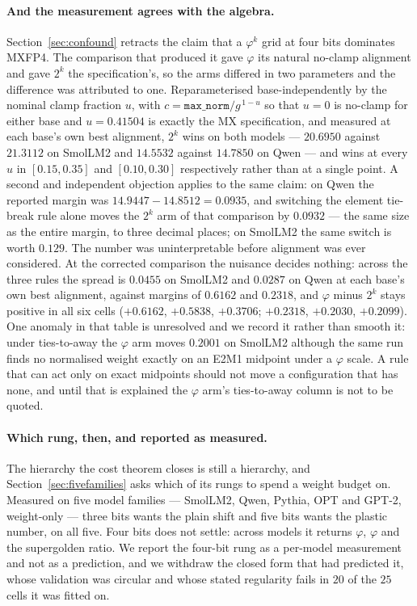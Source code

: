 \documentclass[11pt]{article}
\theoremstyle{definition}
\begin{document}
\paragraph{And the measurement agrees with the algebra.} Section~\ref{sec:confound}
retracts the claim that a $\varphi^{k}$ grid at four bits dominates MXFP4. The
comparison that produced it gave $\varphi$ its natural no-clamp alignment and
gave $2^{k}$ the specification's, so the arms differed in two parameters and
the difference was attributed to one. Reparameterised base-independently by
the nominal clamp fraction $u$, with $c = \texttt{max\_norm}/g^{\,1-u}$ so that
$u=0$ is no-clamp for either base and $u = 0.41504$ is exactly the MX
specification, and measured at each base's own best alignment, $2^{k}$ wins on
both models --- $20.6950$ against $21.3112$ on SmolLM2 and $14.5532$ against
$14.7850$ on Qwen --- and wins at every $u$ in $[0.15, 0.35]$ and
$[0.10, 0.30]$ respectively rather than at a single point. A second and
independent objection applies to the same claim: on Qwen the reported margin
was $14.9447 - 14.8512 = 0.0935$, and switching the element tie-break rule
alone moves the $2^{k}$ arm of that comparison by $0.0932$ --- the same size as
the entire margin, to three decimal places; on SmolLM2 the same switch is worth
$0.129$. The number was uninterpretable before alignment was ever considered.
At the corrected comparison the nuisance decides nothing: across the three
rules the spread is $0.0455$ on SmolLM2 and $0.0287$ on Qwen at each base's own
best alignment, against margins of $0.6162$ and $0.2318$, and $\varphi$ minus
$2^{k}$ stays positive in all six cells ($+0.6162$, $+0.5838$, $+0.3706$;
$+0.2318$, $+0.2030$, $+0.2099$). One anomaly in that table is unresolved and
we record it rather than smooth it: under ties-to-away the $\varphi$ arm moves
$0.2001$ on SmolLM2 although the same run finds no normalised weight exactly on
an E2M1 midpoint under a $\varphi$ scale. A rule that can act only on exact
midpoints should not move a configuration that has none, and until that is
explained the $\varphi$ arm's ties-to-away column is not to be quoted.

\paragraph{Which rung, then, and reported as measured.} The hierarchy the cost
theorem closes is still a hierarchy, and Section~\ref{sec:fivefamilies} asks which
of its rungs to spend a weight budget on. Measured on five model families ---
SmolLM2, Qwen, Pythia, OPT and GPT-2, weight-only --- three bits wants the plain
shift and five bits wants the plastic number, on all five. Four bits does not
settle: across models it returns $\varphi$, $\varphi$ and the supergolden ratio.
We report the four-bit rung as a
per-model measurement and not as a prediction, and we withdraw the closed form
that had predicted it, whose validation was circular and whose stated regularity
fails in $20$ of the $25$ cells it was fitted on.
\end{document}
